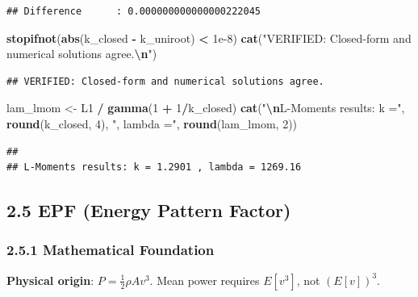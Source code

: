 \documentclass[
]{article}
\newenvironment{Shaded}{\begin{snugshade}}{\end{snugshade}}
\newcommand{\DecValTok}[1]{\textcolor[rgb]{0.00,0.00,0.81}{#1}}
\newcommand{\FloatTok}[1]{\textcolor[rgb]{0.00,0.00,0.81}{#1}}
\newcommand{\FunctionTok}[1]{\textcolor[rgb]{0.13,0.29,0.53}{\textbf{#1}}}
\newcommand{\NormalTok}[1]{#1}
\newcommand{\OtherTok}[1]{\textcolor[rgb]{0.56,0.35,0.01}{#1}}
\newcommand{\SpecialCharTok}[1]{\textcolor[rgb]{0.81,0.36,0.00}{\textbf{#1}}}
\newcommand{\StringTok}[1]{\textcolor[rgb]{0.31,0.60,0.02}{#1}}
\begin{document}
\begin{verbatim}
## Difference      : 0.000000000000000222045
\end{verbatim}

\begin{Shaded}
\begin{Highlighting}[]
\FunctionTok{stopifnot}\NormalTok{(}\FunctionTok{abs}\NormalTok{(k\_closed }\SpecialCharTok{{-}}\NormalTok{ k\_uniroot) }\SpecialCharTok{\textless{}} \FloatTok{1e{-}8}\NormalTok{)}
\FunctionTok{cat}\NormalTok{(}\StringTok{"VERIFIED: Closed{-}form and numerical solutions agree.}\SpecialCharTok{\textbackslash{}n}\StringTok{"}\NormalTok{)}
\end{Highlighting}
\end{Shaded}

\begin{verbatim}
## VERIFIED: Closed-form and numerical solutions agree.
\end{verbatim}

\begin{Shaded}
\begin{Highlighting}[]
\NormalTok{lam\_lmom }\OtherTok{\textless{}{-}}\NormalTok{ L1 }\SpecialCharTok{/} \FunctionTok{gamma}\NormalTok{(}\DecValTok{1} \SpecialCharTok{+} \DecValTok{1}\SpecialCharTok{/}\NormalTok{k\_closed)}
\FunctionTok{cat}\NormalTok{(}\StringTok{"}\SpecialCharTok{\textbackslash{}n}\StringTok{L{-}Moments results: k ="}\NormalTok{, }\FunctionTok{round}\NormalTok{(k\_closed, }\DecValTok{4}\NormalTok{), }\StringTok{", lambda ="}\NormalTok{, }\FunctionTok{round}\NormalTok{(lam\_lmom, }\DecValTok{2}\NormalTok{))}
\end{Highlighting}
\end{Shaded}

\begin{verbatim}
## 
## L-Moments results: k = 1.2901 , lambda = 1269.16
\end{verbatim}

\subsection{2.5 EPF (Energy Pattern
Factor)}\label{epf-energy-pattern-factor}

\subsubsection{2.5.1 Mathematical
Foundation}\label{mathematical-foundation-4}

\textbf{Physical origin}: \(P = \frac{1}{2}\rho A v^3\). Mean power
requires \(E[v^3]\), not \((E[v])^3\).
\end{document}
